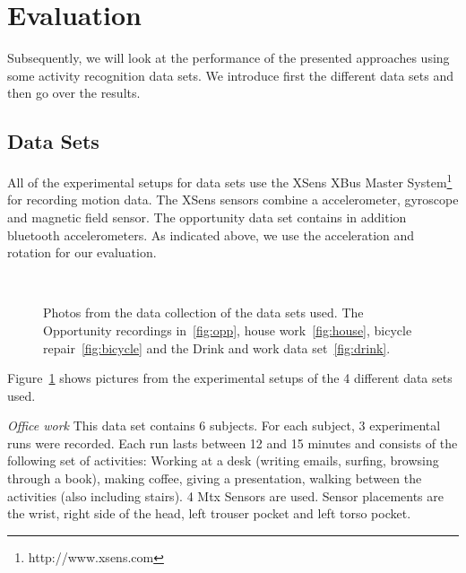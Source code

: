 \section{Evaluation}
\label{onbodyeval}
Subsequently, we will look at the performance of the presented approaches
using some activity recognition data sets. We introduce first the different data sets and then go over the results.

\subsection{Data Sets}

All of the experimental setups for data sets use the XSens
XBus Master System\footnote{http://www.xsens.com} for recording motion
data. The XSens sensors combine a accelerometer, gyroscope and
magnetic field sensor. The opportunity data set contains in addition
bluetooth accelerometers. As indicated above, we use the acceleration and
rotation for our evaluation.
\begin{figure}[!t]
\centering
\begin{center}
      \\   \end{center} 
     \caption[Pictures from the data collection]{Photos from the data collection of the data sets used. The Opportunity recordings in~\ref{fig:opp}, house work~\ref{fig:house}, 
     bicycle repair~\ref{fig:bicycle} and the Drink and work data set~\ref{fig:drink}.
       }
\label{fig:citytrace}
\end{figure}
Figure~\ref{fig:citytrace} shows pictures from the experimental setups
of the 4 different data sets used.

\emph{Office work} This data set contains 6 subjects. For each
subject, 3 experimental runs were recorded. Each run lasts between 12
and 15 minutes and consists of the following set of activities:
Working at a desk (writing emails, surfing, browsing through a book),
making coffee, giving a presentation, walking between the activities
(also including stairs). 4 Mtx Sensors are used. Sensor placements are
the wrist, right side of the head, left trouser pocket and left torso
pocket.

